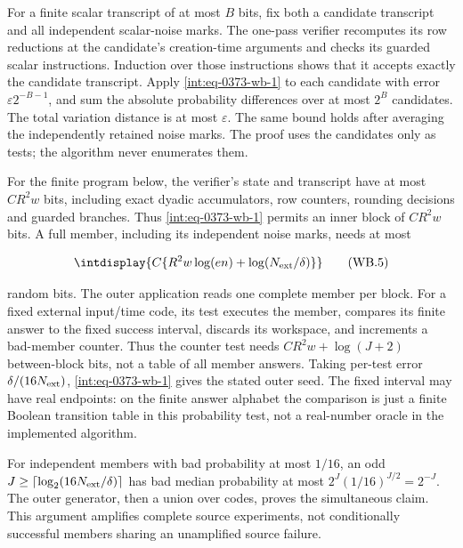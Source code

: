 
For a finite scalar transcript of at most \(B\) bits, fix both a candidate transcript and all independent scalar-noise marks. The one-pass verifier recomputes its row reductions at the candidate's creation-time arguments and checks its guarded scalar instructions. Induction over those instructions shows that it accepts exactly the candidate transcript. Apply \eqref{int:eq-0373-wb-1} to each candidate with error \(\varepsilon 2^{-B-1}\), and sum the absolute probability differences over at most \(2^B\) candidates. The total variation distance is at most \(\varepsilon\). The same bound holds after averaging the independently retained noise marks. The proof uses the candidates only as tests; the algorithm never enumerates them.



For the finite program below, the verifier's state and transcript have at most \(CR^2w\) bits, including exact dyadic accumulators, row counters, rounding decisions and guarded branches. Thus \eqref{int:eq-0373-wb-1} permits an inner block of \(CR^2w\) bits. A full member, including its independent noise marks, needs at most


\begingroup\renewcommand{\theHequation}{intdisplay.785}
\begin{equation}
\intdisplay{
C\{R^2w\log(en)+\log(N_{\rm ext}/\delta)\}
}
\tag{WB.5}
\label{int:eq-0377-wb-5}
\end{equation}
\endgroup


random bits. The outer application reads one complete member per block. For a fixed external input/time code, its test executes the member, compares its finite answer to the fixed success interval, discards its workspace, and increments a bad-member counter. Thus the counter test needs \(CR^2w+\log(J+2)\) between-block bits, not a table of all member answers. Taking per-test error \(\delta/(16N_{\rm ext})\), \eqref{int:eq-0373-wb-1} gives the stated outer seed. The fixed interval may have real endpoints: on the finite answer alphabet the comparison is just a finite Boolean transition table in this probability test, not a real-number oracle in the implemented algorithm.



For independent members with bad probability at most \(1/16\), an odd \(J\ge\lceil\log_2(16N_{\rm ext}/\delta)\rceil\) has bad median probability at most \(2^J(1/16)^{J/2}=2^{-J}\). The outer generator, then a union over codes, proves the simultaneous claim. This argument amplifies complete source experiments, not conditionally successful members sharing an unamplified source failure.


